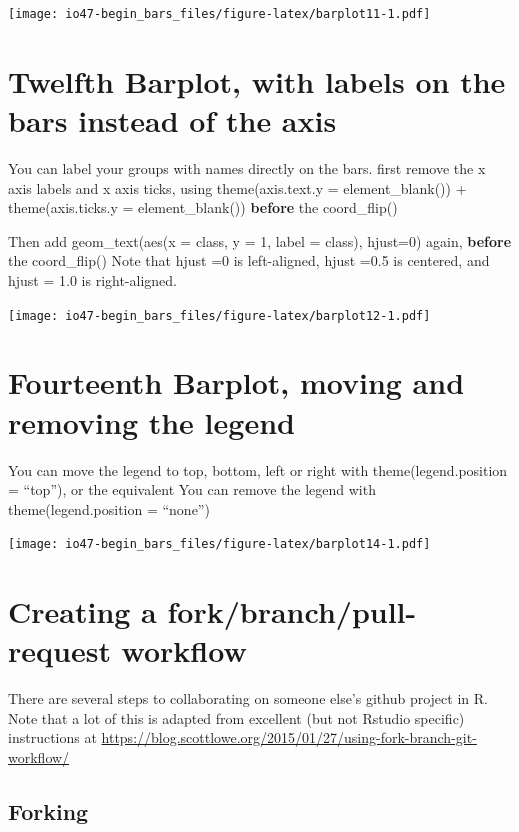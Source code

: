 \documentclass[
]{book}
\begin{document}
\texttt{[image: io47-begin\_bars\_files/figure-latex/barplot11-1.pdf]}

\hypertarget{twelfth-barplot-with-labels-on-the-bars-instead-of-the-axis}{%
\section{Twelfth Barplot, with labels on the bars instead of the axis}\label{twelfth-barplot-with-labels-on-the-bars-instead-of-the-axis}}

You can label your groups with names directly on the bars.
first remove the x axis labels and x axis ticks,
using
theme(axis.text.y = element\_blank()) +
theme(axis.ticks.y = element\_blank())
\textbf{before} the coord\_flip()

Then add geom\_text(aes(x = class, y = 1, label = class), hjust=0)
again, \textbf{before} the coord\_flip()
Note that hjust =0 is left-aligned, hjust =0.5 is centered, and hjust = 1.0 is right-aligned.

\texttt{[image: io47-begin\_bars\_files/figure-latex/barplot12-1.pdf]}

\hypertarget{fourteenth-barplot-moving-and-removing-the-legend}{%
\section{Fourteenth Barplot, moving and removing the legend}\label{fourteenth-barplot-moving-and-removing-the-legend}}

You can move the legend to top, bottom, left or right with theme(legend.position = ``top''), or the equivalent
You can remove the legend with theme(legend.position = ``none'')

\texttt{[image: io47-begin\_bars\_files/figure-latex/barplot14-1.pdf]}

\hypertarget{creating-a-forkbranchpull-request-workflow}{%
\section{Creating a fork/branch/pull-request workflow}\label{creating-a-forkbranchpull-request-workflow}}

There are several steps to collaborating on someone else's github project in R.
Note that a lot of this is adapted from excellent (but not Rstudio specific) instructions at
\url{https://blog.scottlowe.org/2015/01/27/using-fork-branch-git-workflow/}

\hypertarget{forking}{%
\subsection{Forking}\label{forking}}
\end{document}
